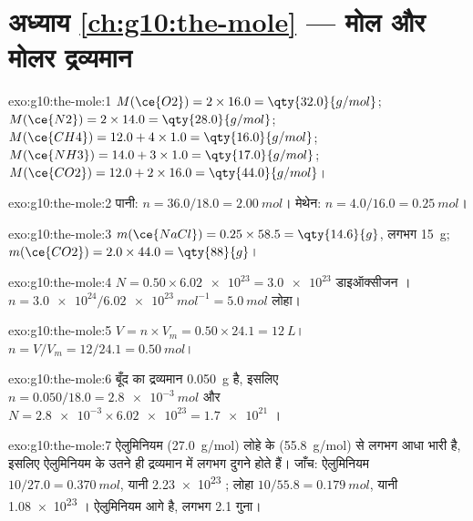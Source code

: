 \section*{अध्याय \ref{ch:g10:the-mole} --- मोल और मोलर द्रव्यमान}

\begin{solution}{exo:g10:the-mole:1}
$M(\ce{O2}) = 2 \times 16.0 = \qty{32.0}{g/mol}$;
$M(\ce{N2}) = 2 \times 14.0 = \qty{28.0}{g/mol}$;
$M(\ce{CH4}) = 12.0 + 4 \times 1.0 = \qty{16.0}{g/mol}$;
$M(\ce{NH3}) = 14.0 + 3 \times 1.0 = \qty{17.0}{g/mol}$;
$M(\ce{CO2}) = 12.0 + 2 \times 16.0 = \qty{44.0}{g/mol}$।
\end{solution}

\begin{solution}{exo:g10:the-mole:2}
पानी: $n = 36.0 / 18.0 = \qty{2.00}{mol}$। मेथेन:
$n = 4.0 / 16.0 = \qty{0.25}{mol}$।
\end{solution}

\begin{solution}{exo:g10:the-mole:3}
$m(\ce{NaCl}) = 0.25 \times 58.5 = \qty{14.6}{g}$, लगभग \qty{15}{g};
$m(\ce{CO2}) = 2.0 \times 44.0 = \qty{88}{g}$।
\end{solution}

\begin{solution}{exo:g10:the-mole:4}
$N = 0.50 \times \num{6.02e23} = \num{3.0e23}$ डाइऑक्सीजन ।
$n = \num{3.0e24} / \qty{6.02e23}{mol^{-1}} = \qty{5.0}{mol}$ लोहा।
\end{solution}

\begin{solution}{exo:g10:the-mole:5}
$V = n \times V_m = 0.50 \times 24.1 = \qty{12}{L}$।
$n = V / V_m = 12 / 24.1 = \qty{0.50}{mol}$।
\end{solution}

\begin{solution}{exo:g10:the-mole:6}
बूँद का द्रव्यमान \qty{0.050}{g} है, इसलिए
$n = 0.050 / 18.0 = \qty{2.8e-3}{mol}$ और
$N = \num{2.8e-3} \times \num{6.02e23} = \num{1.7e21}$ ।
\end{solution}

\begin{solution}{exo:g10:the-mole:7}
ऐलुमिनियम  (\qty{27.0}{g/mol}) लोहे के  (\qty{55.8}{g/mol}) से
लगभग आधा भारी है, इसलिए ऐलुमिनियम के उतने ही द्रव्यमान में लगभग
दुगने  होते हैं। जाँच: ऐलुमिनियम $10/27.0 = \qty{0.370}{mol}$, यानी
\num{2.23e23} ; लोहा $10/55.8 = \qty{0.179}{mol}$, यानी
\num{1.08e23} । ऐलुमिनियम आगे है, लगभग 2.1 गुना।
\end{solution}

